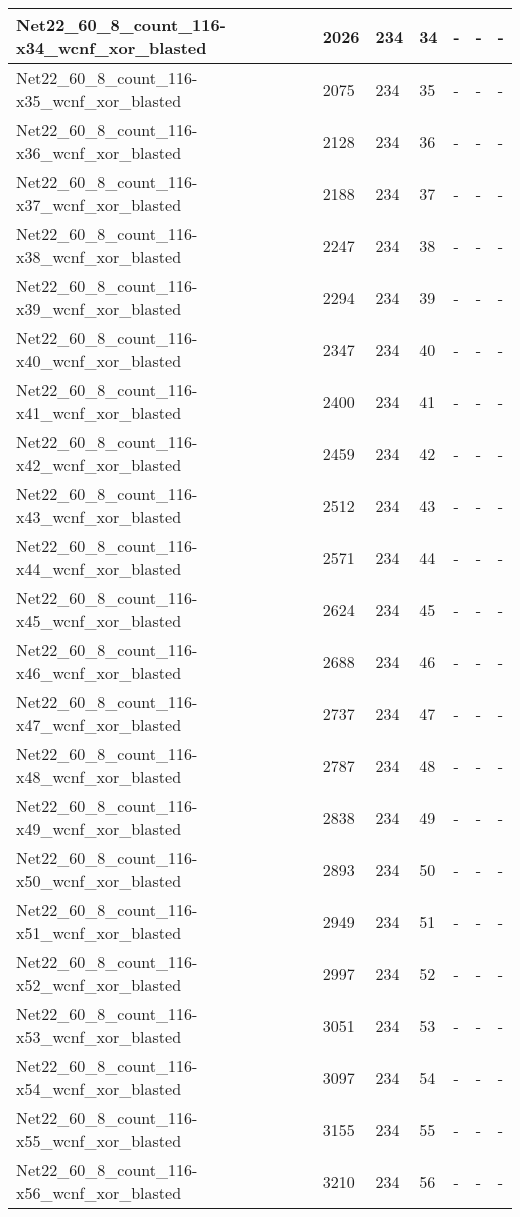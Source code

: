 \begin{scriptsize}
\begin{longtable}{|p{5cm}|l|l|l|l|l|l|}
Net22\_60\_8\_count\_116-x34\_wcnf\_xor\_blasted&2026&234&34&-&-&- \\ \hline 
Net22\_60\_8\_count\_116-x35\_wcnf\_xor\_blasted&2075&234&35&-&-&- \\ \hline 
Net22\_60\_8\_count\_116-x36\_wcnf\_xor\_blasted&2128&234&36&-&-&- \\ \hline 
Net22\_60\_8\_count\_116-x37\_wcnf\_xor\_blasted&2188&234&37&-&-&- \\ \hline 
Net22\_60\_8\_count\_116-x38\_wcnf\_xor\_blasted&2247&234&38&-&-&- \\ \hline 
Net22\_60\_8\_count\_116-x39\_wcnf\_xor\_blasted&2294&234&39&-&-&- \\ \hline 
Net22\_60\_8\_count\_116-x40\_wcnf\_xor\_blasted&2347&234&40&-&-&- \\ \hline 
Net22\_60\_8\_count\_116-x41\_wcnf\_xor\_blasted&2400&234&41&-&-&- \\ \hline 
Net22\_60\_8\_count\_116-x42\_wcnf\_xor\_blasted&2459&234&42&-&-&- \\ \hline 
Net22\_60\_8\_count\_116-x43\_wcnf\_xor\_blasted&2512&234&43&-&-&- \\ \hline 
Net22\_60\_8\_count\_116-x44\_wcnf\_xor\_blasted&2571&234&44&-&-&- \\ \hline 
Net22\_60\_8\_count\_116-x45\_wcnf\_xor\_blasted&2624&234&45&-&-&- \\ \hline 
Net22\_60\_8\_count\_116-x46\_wcnf\_xor\_blasted&2688&234&46&-&-&- \\ \hline 
Net22\_60\_8\_count\_116-x47\_wcnf\_xor\_blasted&2737&234&47&-&-&- \\ \hline 
Net22\_60\_8\_count\_116-x48\_wcnf\_xor\_blasted&2787&234&48&-&-&- \\ \hline 
Net22\_60\_8\_count\_116-x49\_wcnf\_xor\_blasted&2838&234&49&-&-&- \\ \hline 
Net22\_60\_8\_count\_116-x50\_wcnf\_xor\_blasted&2893&234&50&-&-&- \\ \hline 
Net22\_60\_8\_count\_116-x51\_wcnf\_xor\_blasted&2949&234&51&-&-&- \\ \hline 
Net22\_60\_8\_count\_116-x52\_wcnf\_xor\_blasted&2997&234&52&-&-&- \\ \hline 
Net22\_60\_8\_count\_116-x53\_wcnf\_xor\_blasted&3051&234&53&-&-&- \\ \hline 
Net22\_60\_8\_count\_116-x54\_wcnf\_xor\_blasted&3097&234&54&-&-&- \\ \hline 
Net22\_60\_8\_count\_116-x55\_wcnf\_xor\_blasted&3155&234&55&-&-&- \\ \hline 
Net22\_60\_8\_count\_116-x56\_wcnf\_xor\_blasted&3210&234&56&-&-&- \\ \hline 

\end{longtable}
\end{scriptsize}
